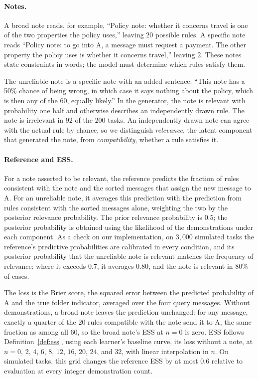 \documentclass{article}
\theoremstyle{definition}
\begin{document}
\paragraph{Notes.}
A broad note reads, for example, ``Policy note: whether it concerns travel is one of the two properties the policy uses,'' leaving $20$ possible rules. A specific note reads ``Policy note: to go into A, a message must request a payment. The other property the policy uses is whether it concerns travel,'' leaving $2$. These notes state constraints in words; the model must determine which rules satisfy them.

The unreliable note is a specific note with an added sentence: ``This note has a 50\% chance of being wrong, in which case it says nothing about the policy, which is then any of the 60, equally likely.'' In the generator, the note is relevant with probability one half and otherwise describes an independently drawn rule. The note is irrelevant in $92$ of the $200$ tasks. An independently drawn note can agree with the actual rule by chance, so we distinguish \emph{relevance}, the latent component that generated the note, from \emph{compatibility}, whether a rule satisfies it.

\paragraph{Reference and ESS.}
For a note asserted to be relevant, the reference predicts the fraction of rules consistent with the note and the sorted messages that assign the new message to A. For an unreliable note, it averages this prediction with the prediction from rules consistent with the sorted messages alone, weighting the two by the posterior relevance probability. The prior relevance probability is $0.5$; the posterior probability is obtained using the likelihood of the demonstrations under each component. As a check on our implementation, on $3{,}000$ simulated tasks the reference's predictive probabilities are calibrated in every condition, and its posterior probability that the unreliable note is relevant matches the frequency of relevance: where it exceeds $0.7$, it averages $0.80$, and the note is relevant in $80\%$ of cases.

The loss is the Brier score, the squared error between the predicted probability of A and the true folder indicator, averaged over the four query messages. Without demonstrations, a broad note leaves the prediction unchanged: for any message, exactly a quarter of the $20$ rules compatible with the note send it to A, the same fraction as among all $60$, so the broad note's ESS at $n=0$ is zero. ESS follows Definition~\ref{def:ess}, using each learner's baseline curve, its loss without a note, at $n=0$, $2$, $4$, $6$, $8$, $12$, $16$, $20$, $24$, and $32$, with linear interpolation in $n$. On simulated tasks, this grid changes the reference ESS by at most $0.6$ relative to evaluation at every integer demonstration count.
\end{document}
